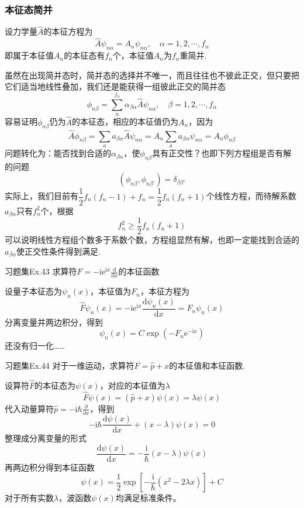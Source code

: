 \subsubsection{本征态简并}

设力学量$\hat{A}$的本征方程为
$$
    \hat{A}\psi_{n\alpha}=A_n\psi_{n\alpha}, \quad \alpha =1, 2, \cdots, f_n
$$
即属于本征值$A_n$的本征态有$f_n$个，本征值$A_n$为$f_n$重简并.

虽然在出现简并态时，简并态的选择并不唯一，而且往往也不彼此正交，但只要把它们适当地线性叠加，我们还是能获得一组彼此正交的简并态
$$
    \phi_{n\beta} = \sum_{a}^{f_n} \alpha_{\beta\alpha}\hat{A}\psi_{n\alpha}, \quad \beta = 1, 2, \cdots, f_{\alpha}
$$
容易证明$\phi_{n\beta}$仍为$\hat{A}$的本征态，相应的本征值仍为$A_n$，因为
$$
    \hat{A}\phi_{n\beta}
    = \sum_{a}a_{\beta\alpha}\hat{A}\psi_{n\alpha}
    = A_n\sum_{a}a_{\beta\alpha}\psi_{n\alpha}
    = A_n\phi_{n\beta}
$$
问题转化为：能否找到合适的$\alpha_{\beta\alpha}$，使$\phi_{n\beta}$具有正交性？也即下列方程组是否有解的问题
$$
    \left(\phi_{n\beta}, \phi_{n\beta'}\right)=\delta_{\beta\beta'}
$$
实际上，我们目前有$\dfrac{1}{2}f_n(f_n-1)+f_n=\dfrac{1}{2}f_n(f_n+1)$个线性方程，而待解系数$a_{\beta\alpha}$只有$f_n^2$个，根据
$$
    f_n^2 \geqslant \frac{1}{2}f_n(f_n+1)
$$
可以说明线性方程组个数多于系数个数，方程组显然有解，也即一定能找到合适的$a_{\beta\alpha}$使正交性条件得到满足.

\begin{question}{习题集Ex.43}
    求算符$\displaystyle \hat{F}=-\mathrm{ie}^{\mathrm{i}x}\frac{\mathrm{d}}{\mathrm{d}x}$的本征函数
\end{question}
\begin{solution}
    设量子本征态为$\psi_n(x)$，本征值为$F_n$，本征方程为
    $$
        \hat{F}\psi_n(x) = -\mathrm{ie}^{\mathrm{i}x}\frac{\mathrm{d}\psi_n(x)}{\mathrm{d}x} = F_n\psi_n(x)
    $$
    分离变量并两边积分，得到
    $$
        \psi_n(x)=C\exp\left(-F_n\mathrm{e}^{-\mathrm{i}x}\right)
    $$
    还没有归一化……
\end{solution}



\begin{question}{习题集Ex.44}
    对于一维运动，求算符$\hat{F}=\hat{p}+x$的本征值和本征函数.
\end{question}
\begin{solution}
    设算符$\hat{F}$的本征态为$\psi(x)$，对应的本征值为$\lambda$
    $$
        \hat{F}\psi(x) = (\hat{p}+x)\psi(x) = \lambda\psi(x)
    $$
    代入动量算符$\hat{p}=-\mathrm{i}\hbar\frac{\partial}{\partial x}$，得到
    $$
        -\mathrm{i}\hbar\frac{\mathrm{d}\psi(x)}{\mathrm{d}x}+(x-\lambda)\psi(x)=0
    $$
    整理成分离变量的形式
    $$
        \frac{\mathrm{d}\psi(x)}{\mathrm{d}x}=-\frac{\mathrm{i}}{\hbar}(x-\lambda)\psi(x)
    $$
    再两边积分得到本征函数
    $$
        \psi(x)=\frac{1}{2}\exp\left[-\frac{\mathrm{i}}{\hbar}(x^2-2\lambda x)\right]+C
    $$
    对于所有实数$\lambda$，波函数$\psi(x)$均满足标准条件。
\end{solution}



